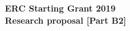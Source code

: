 \documentclass[11pt]{article}
\begin{document}
\begin{center}
    \vbox{\vspace{1.5cm}}
    \Large{\textbf{%
        ERC Starting Grant 2019\\
        Research proposal [Part B2]\\}
    }
    \vspace{1cm}
\end{center}



\tableofcontents






\end{document}
